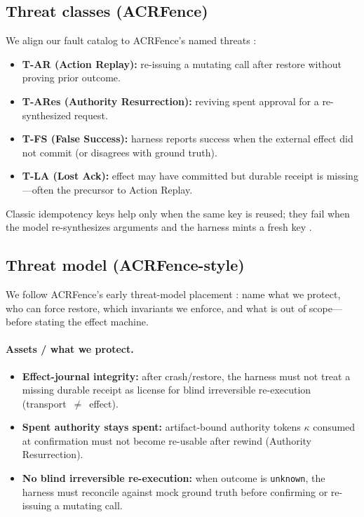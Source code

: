 \documentclass[11pt,a4paper]{article}
\begin{document}
\subsection{Threat classes (ACRFence)}

We align our fault catalog to ACRFence's named threats
\cite{acrfence2026}:
\begin{itemize}
\item \textbf{T-AR (Action Replay):} re-issuing a mutating call after
  restore without proving prior outcome.
\item \textbf{T-ARes (Authority Resurrection):} reviving spent approval
  for a re-synthesized request.
\item \textbf{T-FS (False Success):} harness reports success when the
  external effect did not commit (or disagrees with ground truth).
\item \textbf{T-LA (Lost Ack):} effect may have committed but durable
  receipt is missing---often the precursor to Action Replay.
\end{itemize}
Classic idempotency keys help only when the same key is reused; they fail
when the model re-synthesizes arguments and the harness mints a fresh key
\cite{beyondtokens2026}.

\subsection{Threat model (ACRFence-style)}
\label{sec:threat-model}

We follow ACRFence's early threat-model placement \cite{acrfence2026}: name
what we protect, who can force restore, which invariants we enforce, and
what is out of scope---before stating the effect machine.

\paragraph{Assets / what we protect.}
\begin{itemize}
\item \textbf{Effect-journal integrity:} after crash/restore, the harness
  must not treat a missing durable receipt as license for blind irreversible
  re-execution (transport~$\neq$~effect).
\item \textbf{Spent authority stays spent:} artifact-bound authority tokens
  $\kappa$ consumed at confirmation must not become re-usable after rewind
  (Authority Resurrection).
\item \textbf{No blind irreversible re-execution:} when outcome is
  \texttt{unknown}, the harness must reconcile against mock ground truth
  before confirming or re-issuing a mutating call.
\end{itemize}
\end{document}
